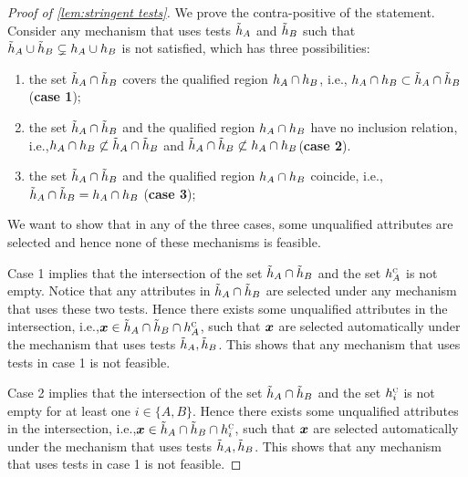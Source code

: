 
\begin{proof}[Proof of \cref{lem:stringent tests}]
We prove the contra-positive of the statement.
    Consider any mechanism that uses tests $\tilde{h}_A$ and $\tilde{h}_B$ such that $\tilde{h}_A\cup\tilde{h}_B\subsetneq h_A\cup h_B$ is not satisfied, which has three possibilities:
    \begin{enumerate}
        \item the set $\tilde {h}_A\cap \tilde{h}_B$ covers the qualified region $h_A\cap h_B$, i.e., $h_A\cap h_B \subset\tilde {h}_A\cap \tilde{h}_B  $ (\textbf{case 1}); 
        \item the set $\tilde {h}_A\cap \tilde{h}_B$ and the qualified region $h_A\cap h_B$ have no inclusion relation, i.e.,$h_A\cap h_B \not\subset\tilde {h}_A\cap \tilde{h}_B  $ and  $\tilde {h}_A\cap \tilde{h}_B  \not\subset h_A\cap h_B $(\textbf{case 2}).
        \item the set $\tilde {h}_A\cap \tilde{h}_B$ and the qualified region $h_A\cap h_B$ coincide, i.e., $\tilde {h}_A\cap \tilde{h}_B = h_A\cap h_B$  (\textbf{case 3});   
    \end{enumerate} 
      
    
    We want to show that in any of the three cases, some unqualified attributes are selected and hence none of these mechanisms is feasible. 
    

    
    Case 1 implies that the intersection of the set
    $\tilde {h}_A\cap \tilde{h}_B$ and the set $ h_A^{\textsc{c}} $ is not empty.
     Notice that any attributes in $\tilde {h}_A\cap \tilde{h}_B$ are selected under any mechanism that uses these two tests.
    Hence there exists some unqualified attributes in the intersection, i.e.,$\boldsymbol{x} \in \tilde {h}_A\cap \tilde{h}_B  \cap h_A^{\textsc{c}}$, such that $\boldsymbol{x}$ are selected automatically under the mechanism that uses tests $\tilde {h}_A, \tilde{h}_B$.
    This shows that any mechanism that uses tests in case 1 is not feasible.

    Case 2 implies that the intersection of the set
    $\tilde {h}_A\cap \tilde{h}_B$ and the set $ h_i^{\textsc{c}} $ is not empty for at least one $i\in \{A,B\}$.
    Hence there exists some unqualified attributes in the intersection, i.e.,$\boldsymbol{x} \in \tilde {h}_A\cap \tilde{h}_B  \cap h_i^{\textsc{c}}$, such that $\boldsymbol{x}$ are selected automatically under the mechanism that uses tests $\tilde {h}_A, \tilde{h}_B$.
    This shows that any mechanism that uses tests in case 1 is not feasible.



\end{proof}
